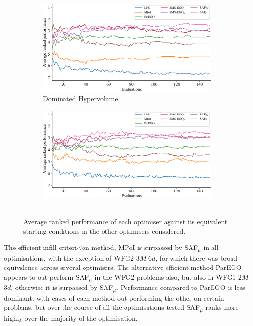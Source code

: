 \documentclass[conference]{IEEEtran}
\newcommand{\ndim}{d}
\newcommand{\nobj}{M}
\DeclareMathOperator*{\igdp}{IGD^{+}}
\newcommand\hpv{Dominated Hypervolume\xspace}
\newcommand\safmu{SAF$_{\mu}$\xspace}
\newcommand\parego{ParEGO\xspace}
\newcommand\mpoi{MPoI\xspace}
\begin{document}
\begin{figure}[t]
\begin{subfigure}[b]{\columnwidth}
         \centering
         \includegraphics[width=\columnwidth]{figures/_ranked_performance_plot_hv.pdf}
         \caption{\hpv}
     \end{subfigure}
\begin{subfigure}[b]{\columnwidth}
         \centering
         \includegraphics[width=\columnwidth]{figures/_ranked_performance_plot_igd.pdf}
         \caption{$\igdp$}
     \end{subfigure}
\caption{Average ranked performance of each optimiser against its equivalent starting conditions in the other optimisers considered.}
\label{fig: ranked_plots}
\end{figure}

The efficient infill criteri<on method, \mpoi is surpassed by \safmu in all optimisations, with the exception of WFG2 3$\nobj$ 6$\ndim$, for which there was broad equivalence across several optimisers. The alternative efficient method \parego appears to out-perform \safmu in the WFG2 problems also, but also in WFG1 $2\nobj$ $3\ndim$, otherwise it is surpassed by \safmu. Performance compared to \parego is less dominant. with cases of each method out-performing the other on certain problems, but over the course of all the optimisations tested \safmu ranks more highly over the majority of the optimisation. 
\end{document}
